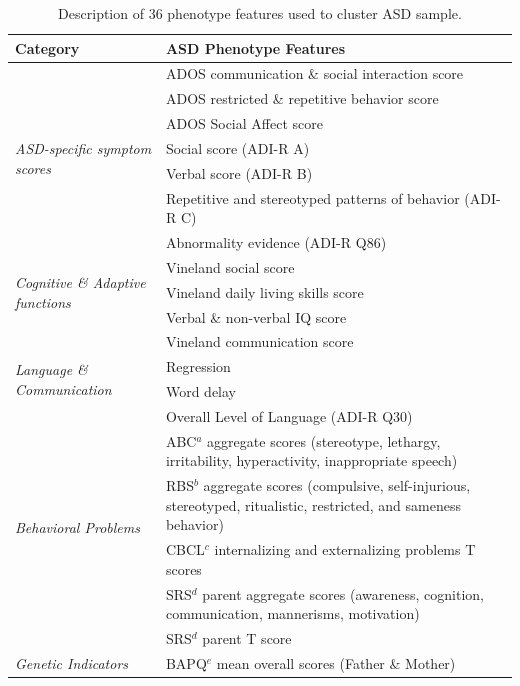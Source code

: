 \documentclass{bmcart}
\begin{document}
\begin{table}
\caption{Description of 36 phenotype features used to cluster ASD sample.}
\label{ASD-features}
\begin{tabular}{p{3.8cm}p{7.5cm}}
\toprule
\textbf{Category}                    & \textbf{ASD Phenotype Features}                                                         \\ \midrule
\multirow{7}{*}{\textit{ASD-specific symptom scores}}    
& ADOS communication \& social interaction score  \\               & ADOS restricted \& repetitive behavior score   \\ &ADOS Social Affect score\\
& Social score (ADI-R A)\\                                               & Verbal score (ADI-R B) \\                                                                       
& Repetitive and stereotyped patterns of behavior (ADI-R C)\\
&Abnormality evidence (ADI-R Q86)\\
 \midrule
\multirow{3}{*}{\textit{Cognitive \& Adaptive functions}}                             
& Vineland social score                                                     \\ 
& Vineland daily living skills score \\
& Verbal \& non-verbal IQ score \\ \midrule
\multirow{4}{*}{\textit{Language \& Communication}}         
&Vineland communication score\\
& Regression \\&Word delay  \\&Overall Level of Language (ADI-R Q30)\\  \midrule
\multirow{4}{*}{\textit{Behavioral Problems}}                
&ABC$^{a}$ aggregate scores (stereotype, lethargy, irritability, hyperactivity, inappropriate speech)                  \\ 
& RBS$^{b}$ aggregate scores (compulsive, self-injurious, stereotyped, ritualistic, restricted, and sameness behavior) \\ 
& CBCL$^{c}$ internalizing and externalizing problems T scores \\
& SRS$^{d}$ parent aggregate scores (awareness, cognition, communication, mannerisms, motivation)   \\             
& SRS$^{d}$ parent T score\\  \midrule
\textit{Genetic Indicators}                                  
& BAPQ$^{e}$ mean overall scores (Father \& Mother)                                                                           \\ \bottomrule


\end{tabular}
\end{table}
\end{document}
